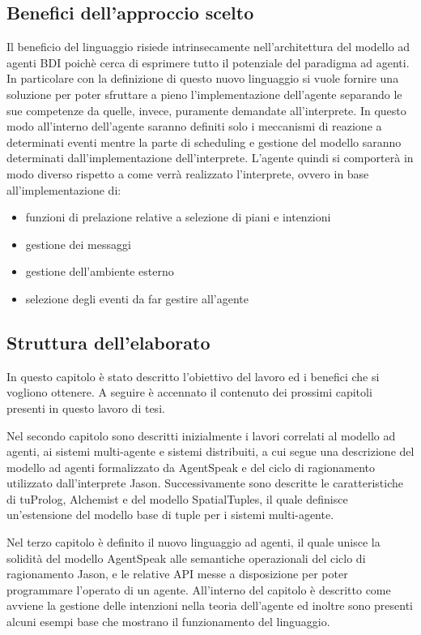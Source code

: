 \subsection*{Benefici dell'approccio scelto}
Il beneficio del linguaggio risiede intrinsecamente nell'architettura del modello ad agenti BDI poichè cerca di esprimere tutto il potenziale del paradigma ad agenti.
In particolare con la definizione di questo nuovo linguaggio si vuole fornire una soluzione per poter sfruttare a pieno l'implementazione dell'agente separando le sue competenze da quelle, invece, puramente demandate all'interprete.
In questo modo all'interno dell'agente saranno definiti solo i meccanismi di reazione a determinati eventi mentre la parte di scheduling e gestione del modello saranno determinati dall'implementazione dell'interprete.
L'agente quindi si comporterà in modo diverso rispetto a come verrà realizzato l'interprete, ovvero in base all'implementazione di:
\begin{itemize}
\item funzioni di prelazione relative a selezione di piani e intenzioni
\item gestione dei messaggi
\item gestione dell'ambiente esterno
\item selezione degli eventi da far gestire all'agente
\end{itemize}

\subsection*{Struttura dell'elaborato}
In questo capitolo è stato descritto l'obiettivo del lavoro ed i benefici che si vogliono ottenere.
A seguire è accennato il contenuto dei prossimi capitoli presenti in questo lavoro di tesi.

Nel secondo capitolo sono descritti inizialmente i lavori correlati al modello ad agenti, ai sistemi multi-agente e sistemi distribuiti, a cui segue una descrizione del modello ad agenti formalizzato da AgentSpeak e del ciclo di ragionamento utilizzato dall'interprete Jason.
Successivamente sono descritte le caratteristiche di tuProlog, Alchemist e del modello SpatialTuples, il quale definisce un'estensione del modello base di tuple per i sistemi multi-agente.

Nel terzo capitolo è definito il nuovo linguaggio ad agenti, il quale unisce la solidità del modello AgentSpeak alle semantiche operazionali del ciclo di ragionamento Jason, e le relative API messe a disposizione per poter programmare l'operato di un agente.
All'interno del capitolo è descritto come avviene la gestione delle intenzioni nella teoria dell'agente ed inoltre sono presenti alcuni esempi base che mostrano il funzionamento del linguaggio.

